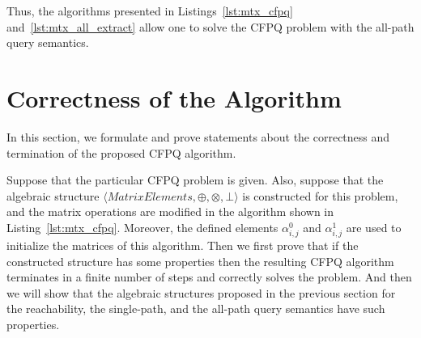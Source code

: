 Thus, the algorithms presented in Listings~\ref{lst:mtx_cfpq} and~\ref{lst:mtx_all_extract} allow one to solve the CFPQ problem with the all-path query semantics.


\section{Correctness of the Algorithm}\label{sec:ch3/sect2}
In this section, we formulate and prove statements about the correctness and termination of the proposed CFPQ algorithm.

Suppose that the particular CFPQ problem is given. Also, suppose that the algebraic structure $\langle \textit{MatrixElements}, \oplus, \otimes, \bot \rangle$ is constructed for this problem, and the matrix operations are modified in the algorithm shown in Listing~\ref{lst:mtx_cfpq}. Moreover, the defined elements $\alpha^0_{i, j}$ and $\alpha^1_{i, j}$ are used to initialize the matrices of this algorithm. Then we first prove that if the constructed structure has some properties then the resulting CFPQ algorithm terminates in a finite number of steps and correctly solves the problem. And then we will show that the algebraic structures proposed in the previous section for the reachability, the single-path, and the all-path query semantics have such properties.

